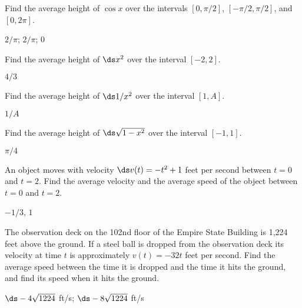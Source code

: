 \begin{exercises}

\begin{exercise} Find the average height of $\cos x$ over the intervals
$[0,\pi/2]$, $[-\pi/2,\pi/2]$, and $[0,2\pi]$.
\begin{answer} $2/\pi$; $2/\pi$; $0$
\end{answer}\end{exercise}

\begin{exercise} Find the average height of $\ds x^2$ over the interval
$[-2,2]$.
\begin{answer} $4/3$
\end{answer}\end{exercise}

\begin{exercise} Find the average height of $\ds 1/x^2$ over the interval
$[1,A]$.
\begin{answer} $1/A$
\end{answer}\end{exercise}

\begin{exercise} Find the average height of $\ds \sqrt{1-x^2}$ over the interval
$[-1,1]$.
\begin{answer} $\pi/4$
\end{answer}\end{exercise}

\begin{exercise} An object moves with velocity $\ds v(t)=-t^2+1$ feet per second
between $t=0$ and $t=2$. Find the average velocity and the average
speed of the object between $t=0$ and $t=2$.
\begin{answer} $-1/3$, $1$
\end{answer}\end{exercise}

\begin{exercise} The observation deck on the 102nd floor of the Empire State Building
is 1,224 feet above the ground. If a steel ball is dropped from the
observation deck its velocity at time $t$ is approximately $v(t)=-32t$
feet per second. Find the average speed between the time it is dropped
and the time it hits the ground, and find its speed when it hits the
ground.
\begin{answer} $\ds -4\sqrt{1224}$ ft/s; $\ds -8\sqrt{1224}$ ft/s
\end{answer}\end{exercise}

\end{exercises}

